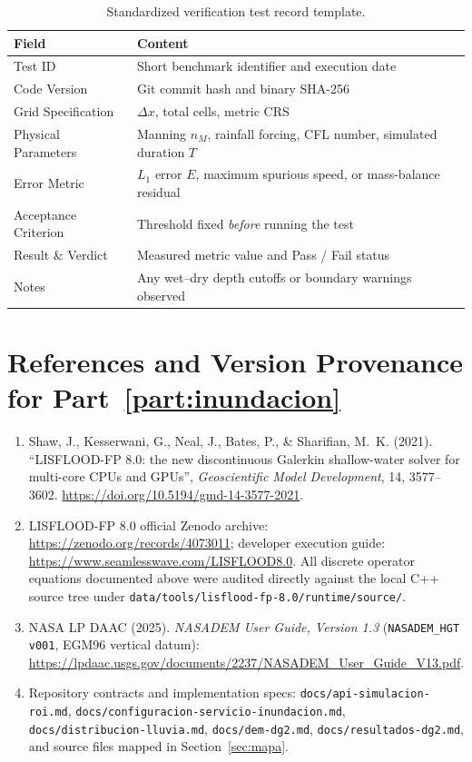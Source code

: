 \documentclass[11pt,a4paper]{article}
\newcommand{\src}[1]{\nolinkurl{#1}}
\begin{document}
\begin{table}[htbp]
\centering
\caption{Standardized verification test record template.}
\label{tab:registro}
\small
\begin{tabularx}{\linewidth}{@{}lX@{}}
\toprule
Field & Content \\
\midrule
Test ID & Short benchmark identifier and execution date \\
Code Version & Git commit hash and binary SHA-256 \\
Grid Specification & $\Delta x$, total cells, metric CRS \\
Physical Parameters & Manning $n_M$, rainfall forcing, CFL number, simulated duration $T$ \\
Error Metric & $L_1$ error $E$, maximum spurious speed, or mass-balance residual \\
Acceptance Criterion & Threshold fixed \emph{before} running the test \\
Result \& Verdict & Measured metric value and Pass / Fail status \\
Notes & Any wet--dry depth cutoffs or boundary warnings observed \\
\bottomrule
\end{tabularx}
\end{table}


\section{References and Version Provenance for Part~\ref{part:inundacion}}
\begin{enumerate}
\item Shaw, J., Kesserwani, G., Neal, J., Bates, P., \& Sharifian, M.~K. (2021). ``LISFLOOD-FP 8.0: the new discontinuous Galerkin shallow-water solver for multi-core CPUs and GPUs'', \emph{Geoscientific Model Development}, 14, 3577--3602. \url{https://doi.org/10.5194/gmd-14-3577-2021}.
\item LISFLOOD-FP 8.0 official Zenodo archive: \url{https://zenodo.org/records/4073011}; developer execution guide: \url{https://www.seamlesswave.com/LISFLOOD8.0}. All discrete operator equations documented above were audited directly against the local C++ source tree under \src{data/tools/lisflood-fp-8.0/runtime/source/}.
\item NASA LP DAAC (2025). \emph{NASADEM User Guide, Version 1.3} (\texttt{NASADEM\_HGT v001}, EGM96 vertical datum): \url{https://lpdaac.usgs.gov/documents/2237/NASADEM_User_Guide_V13.pdf}.
\item Repository contracts and implementation specs: \src{docs/api-simulacion-roi.md}, \src{docs/configuracion-servicio-inundacion.md}, \src{docs/distribucion-lluvia.md}, \src{docs/dem-dg2.md}, \src{docs/resultados-dg2.md}, and source files mapped in Section~\ref{sec:mapa}.
\end{enumerate}
\end{document}
